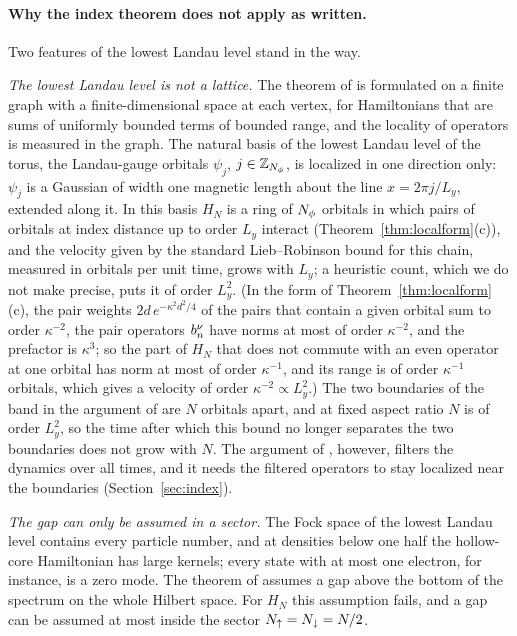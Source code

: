 \paragraph{Why the index theorem does not apply as written.}
Two features of the lowest Landau level stand in the way.

\emph{The lowest Landau level is not a lattice.} The theorem of \cite{BBDF21} is formulated on a finite graph
with a finite-dimensional space at each vertex, for Hamiltonians that are sums of uniformly bounded terms of
bounded range, and the locality of operators is measured in the graph. The natural basis of the lowest
Landau level of the torus, the Landau-gauge orbitals $\psi_j$, $j\in\mathbb{Z}_{N_{\phi}}$, is localized in one
direction only: $\psi_j$ is a Gaussian of width one magnetic length about the line $x=2\pi j/L_y$, extended
along it. In this basis $H_N$ is a ring of $N_{\phi}$ orbitals in which pairs of orbitals at index distance up
to order $L_y$ interact (Theorem~\ref{thm:localform}(c)), and the velocity given by the standard
Lieb--Robinson bound for this chain, measured in orbitals per unit time, grows with $L_y$; a heuristic count,
which we do not make precise, puts it of order $L_y^2$. (In the form of Theorem~\ref{thm:localform}(c), the pair
weights $2d\,e^{-\kappa^2d^2/4}$ of the pairs that contain a given orbital sum to order $\kappa^{-2}$, the pair
operators $b^{\nu}_{n}$ have norms at most of order $\kappa^{-2}$, and the prefactor is $\kappa^3$; so the part of
$H_N$ that does not commute with an even operator at one orbital has norm at most of order $\kappa^{-1}$, and its
range is of order $\kappa^{-1}$ orbitals, which gives a velocity of order $\kappa^{-2}\propto L_y^2$.) The two
boundaries of the band in the argument of
\cite{BBDF21} are $N$ orbitals apart, and at fixed aspect ratio $N$ is of order $L_y^2$, so the time after
which this bound no longer separates the two boundaries does not grow with $N$. The argument of
\cite{BBDF21}, however, filters the dynamics over all times, and it needs the filtered operators to stay
localized near the boundaries (Section~\ref{sec:index}).

\emph{The gap can only be assumed in a sector.} The Fock space of the lowest Landau level contains every
particle number, and at densities below one half the hollow-core Hamiltonian has large kernels; every state
with at most one electron, for instance, is a zero mode. The theorem of \cite{BBDF21} assumes a gap above
the bottom of the spectrum on the whole Hilbert space. For $H_N$ this assumption fails, and a gap can be
assumed at most inside the sector $N_{\uparrow}=N_{\downarrow}=N/2$.

